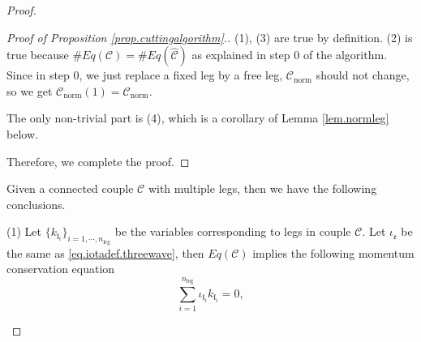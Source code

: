 \begin{proof}
\begin{proof}[Proof of Proposition \ref{prop.cuttingalgorithm}.]

(1), (3) are true by definition. (2) is true because
$\#Eq(\mathcal{C})=\#Eq(\widehat{\mathcal{C}})$ as explained in step $0$ of the algorithm. Since in step $0$, we just replace a fixed leg by a free leg, $\mathcal{C}_{\text{norm}}$ should not change, so we get $\mathcal{C}_{\text{norm}}(1)=\mathcal{C}_{\text{norm}}$. 

The only non-trivial part is (4), which is a corollary of Lemma \ref{lem.normleg} below.

Therefore, we complete the proof.
\end{proof}


\begin{lem}\label{lem.freeleg} %
Given a connected couple $\mathcal{C}$ with multiple legs, then we have the following conclusions.

(1) Let $\{k_{\mathfrak{l}_i}\}_{i=1,\cdots,n_{\text{leg}}}$ be the variables corresponding to legs in couple $\mathcal{C}$. Let $\iota_{\mathfrak{e}}$ be the same as \eqref{eq.iotadef.threewave}, then $Eq(\mathcal{C})$ implies the following momentum conservation equation
\begin{equation}\label{eq.momentumconservation.threewave}
    \sum_{i=1}^{n_{\text{leg}}} \iota_{\mathfrak{l}_i}k_{\mathfrak{l}_i}=0,
\end{equation}


\end{lem}
\end{proof}
